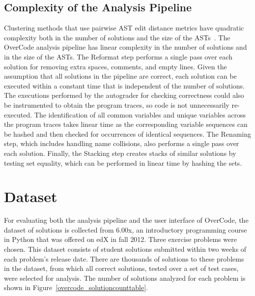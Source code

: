 \subsection{Complexity of the Analysis Pipeline}\label{complexity}
Clustering methods that use pairwise AST edit distance metrics have quadratic complexity both in the number of solutions and the size of the ASTs~\cite{MOOCshop}. The OverCode analysis pipeline has linear complexity in the number of solutions and in the size of the ASTs. The Reformat step performs a single pass over each solution for removing extra spaces, comments, and empty lines. Given the assumption that all solutions in the pipeline are correct, each solution can be executed within a constant time that is independent of the number of solutions. The executions performed by the autograder for checking correctness could also be instrumented to obtain the program traces, so code is not unnecessarily re-executed. The identification of all common variables and unique variables across the program traces takes linear time as the corresponding variable sequences can be hashed and then checked for occurrences of identical sequences. The Renaming step, which includes handling name collisions, also performs a single pass over each solution. Finally, the Stacking step creates stacks of similar solutions by testing set equality, which can be performed in linear time by hashing the sets.


\section{Dataset} \label{dataset}

For evaluating both the analysis pipeline and the user interface of OverCode, the dataset of solutions is collected from 6.00x, an introductory programming course in Python that was offered on edX in fall 2012. Three exercise problems were chosen. This dataset consists of student solutions submitted within two weeks of each problem's release date. There are thousands of solutions to these problems in the dataset, from which all correct solutions, tested over a set of test cases, were selected for analysis. The number of solutions analyzed for each problem is shown in Figure~\ref{overcode_solutioncounttable}.




